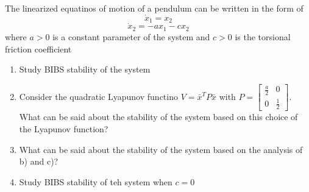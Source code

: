 \item The linearized equatinos of motion of a pendulum can be written in the form of
  \begin{equation}
    \dot x_1 = x_2
  \end{equation}
  \begin{equation}
    \dot x_2 = -ax_1 - cx_2
  \end{equation}
  where $a > 0$ is a constant parameter of the system and $c > 0$ is the torsional friction coefficient
  \begin{enumerate}
  \item Study BIBS stability of the system
  \item Consider the quadratic Lyapunov functino $V = \bar x^T P \bar x$ with
    $P = \begin{bmatrix} \frac a 2 & 0 \\ 0 & \frac 1 2\end{bmatrix}$. What can be said about the stability of
    the system based on this choice of the Lyapunov function?
  \item What can be said about the stability of the system based on the analysis of b) and c)?
  \item Study BIBS stability of teh system when $c=0$
  \end{enumerate}